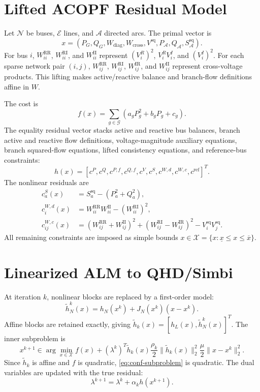 \documentclass[conference]{IEEEtran}
\newcommand{\RR}{\mathrm{RR}}
\newcommand{\RI}{\mathrm{RI}}
\newcommand{\IR}{\mathrm{IR}}
\newcommand{\II}{\mathrm{II}}
\newcommand{\sq}{\mathrm{sq}}
\begin{document}
\section{Lifted ACOPF Residual Model}
Let $\mathcal N$ be buses, $\mathcal E$ lines, and $\mathcal A$ directed arcs. The primal vector is
\begin{equation}
x=(P_G,Q_G,W_{\mathrm{diag}},W_{\mathrm{cross}},V^{\sq},P_{\mathcal A},Q_{\mathcal A},S_{\mathcal A}^{\sq}).
\end{equation}
For bus $i$, $W_{ii}^{\RR}$, $W_{ii}^{\RI}$, and $W_{ii}^{\II}$ represent $(V_i^R)^2$, $V_i^RV_i^I$, and $(V_i^I)^2$. For each sparse network pair $(i,j)$, $W_{ij}^{\RR}$, $W_{ij}^{\RI}$, $W_{ij}^{\IR}$, and $W_{ij}^{\II}$ represent cross-voltage products. This lifting makes active/reactive balance and branch-flow definitions affine in $W$.

The cost is
\begin{equation}
    f(x)=\sum_{g\in\mathcal G}(a_gP_g^2+b_gP_g+c_g).
\end{equation}
The equality residual vector stacks active and reactive bus balances, branch active and reactive flow definitions, voltage-magnitude auxiliary equations, branch squared-flow equations, lifted consistency equations, and reference-bus constraints:
\begin{equation}
    h(x)=\left[c^P,c^Q,c^{P,f},c^{Q,f},c^V,c^S,c^{W,d},c^{W,c},c^{\mathrm{ref}}\right]^T .
\end{equation}
The nonlinear residuals are
\begin{align}
c_a^S(x)&=S_a^{\sq}-(P_a^2+Q_a^2),\\
c_i^{W,d}(x)&=W_{ii}^{\RR}W_{ii}^{\II}-(W_{ii}^{\RI})^2,\\
c_{ij}^{W,c}(x)&=(W_{ij}^{\RR}+W_{ij}^{\II})^2
 +(W_{ij}^{\RI}-W_{ij}^{\IR})^2
 -V_i^{\sq}V_j^{\sq}.
\end{align}
All remaining constraints are imposed as simple bounds $x\in\mathcal X=\{x:\underline{x}\leq x\leq\overline{x}\}$.

\section{Linearized ALM to QHD/Simbi}
At iteration $k$, nonlinear blocks are replaced by a first-order model:
\begin{equation}
\widetilde h_N^k(x)=h_N(x^k)+J_N(x^k)(x-x^k).
\end{equation}
Affine blocks are retained exactly, giving $\widetilde h_k(x)=[h_L(x),\widetilde h_N^k(x)]^T$. The inner subproblem is
\begin{equation}
\label{eq:conf-subproblem}
x^{k+1}\in\arg\min_{x\in\mathcal X}
f(x)+(\lambda^k)^T\widetilde h_k(x)
\frac{\rho_k}{2}\|\widetilde h_k(x)\|_2^2
\frac{\mu}{2}\|x-x^k\|_2^2 .
\end{equation}
Since $\widetilde h_k$ is affine and $f$ is quadratic, \eqref{eq:conf-subproblem} is quadratic. The dual variables are updated with the true residual:
\begin{equation}
    \lambda^{k+1}=\lambda^k+\alpha_k h(x^{k+1}).
\end{equation}
\end{document}
